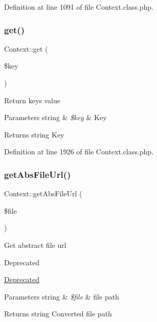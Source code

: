 Definition at line 1091 of file Context.\+class.\+php.

\hypertarget{classContext_a90ce25d65fe6c9778421cbb36ab3def5}{}\label{classContext_a90ce25d65fe6c9778421cbb36ab3def5} 
\subsubsection{\texorpdfstring{get()}{get()}}
{\footnotesize\ttfamily Context\+::get (\begin{DoxyParamCaption}\item[{}]{\$key }\end{DoxyParamCaption})}

Return key\textquotesingle{}s value


\begin{DoxyParams}[1]{Parameters}
string & {\em \$key} & Key \\
\hline
\end{DoxyParams}
\begin{DoxyReturn}{Returns}
string Key 
\end{DoxyReturn}


Definition at line 1926 of file Context.\+class.\+php.

\hypertarget{classContext_a217a7ff0e32178c6a2cc761de9c88998}{}\label{classContext_a217a7ff0e32178c6a2cc761de9c88998} 
\subsubsection{\texorpdfstring{get\+Abs\+File\+Url()}{getAbsFileUrl()}}
{\footnotesize\ttfamily Context\+::get\+Abs\+File\+Url (\begin{DoxyParamCaption}\item[{}]{\$file }\end{DoxyParamCaption})}

Get abstract file url

\begin{DoxyRefDesc}{Deprecated}
\item[\hyperlink{deprecated__deprecated000003}{Deprecated}]\end{DoxyRefDesc}

\begin{DoxyParams}[1]{Parameters}
string & {\em \$file} & file path \\
\hline
\end{DoxyParams}
\begin{DoxyReturn}{Returns}
string Converted file path 
\end{DoxyReturn}


